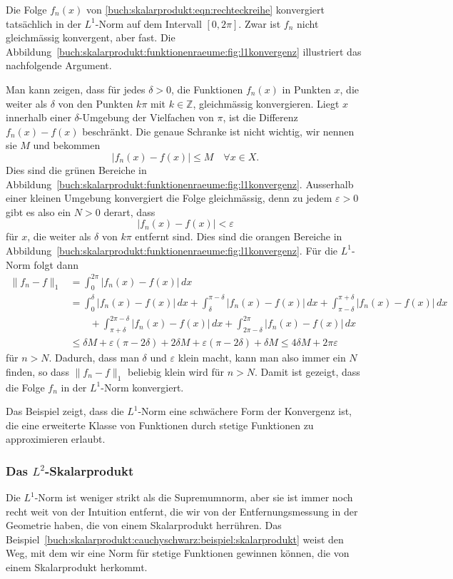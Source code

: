 \begin{beispiel}
Die Folge $f_n(x)$ von \eqref{buch:skalarprodukt:eqn:rechteckreihe}
konvergiert tatsächlich in der $L^1$-Norm auf dem Intervall $[0,2\pi]$.
Zwar ist $f_n$ nicht gleichmässig konvergent, aber fast.
Die Abbildung~\ref{buch:skalarprodukt:funktionenraeume:fig:l1konvergenz}
illustriert das nachfolgende Argument.

Man kann zeigen, dass für jedes $\delta>0$, die Funktionen
$f_n(x)$ in Punkten $x$, die weiter als $\delta$ von den
Punkten $k\pi$ mit $k\in\mathbb{Z}$, gleichmässig konvergieren.
Liegt $x$ innerhalb einer $\delta$-Umgebung der Vielfachen von $\pi$,
ist die Differenz $f_n(x)-f(x)$ beschränkt.
Die genaue Schranke ist nicht wichtig, wir nennen sie $M$ und bekommen
\[
|f_n(x)-f(x)|
\le M
\quad\forall x\in X.
\]
Dies sind die grünen Bereiche in
Abbildung~\ref{buch:skalarprodukt:funktionenraeume:fig:l1konvergenz}.
Ausserhalb einer kleinen Umgebung konvergiert die Folge gleichmässig,
denn zu jedem $\varepsilon>0$ gibt es also ein $N>0$ derart, dass
\[
|f_n(x)-f(x)|<\varepsilon
\]
für $x$, die weiter als $\delta$ von $k\pi$ entfernt sind.
Dies sind die orangen Bereiche in
Abbildung~\ref{buch:skalarprodukt:funktionenraeume:fig:l1konvergenz}.
Für die $L^1$-Norm folgt dann
\begin{align*}
\|f_n-f\|_1
&=
\int_0^{2\pi} |f_n(x)-f(x)|\,dx
\\
&=
\int_0^\delta |f_n(x)-f(x)|\,dx
+
\int_\delta^{\pi-\delta} |f_n(x)-f(x)|\,dx
+
\int_{\pi-\delta}^{\pi+\delta} |f_n(x)-f(x)|\,dx
\\
&\qquad
+
\int_{\pi+\delta}^{2\pi-\delta} |f_n(x)-f(x)|\,dx
+
\int_{2\pi-\delta}^{2\pi} |f_n(x)-f(x)|\,dx
\\
&\le
\delta M
+
\varepsilon (\pi -2\delta)
+
2\delta M
+
\varepsilon (\pi -2\delta)
+
\delta M
\le
4\delta M + 2\pi\varepsilon
\end{align*}
für $n>N$.
Dadurch, dass man $\delta$ und $\varepsilon$ klein macht, kann man
also immer ein $N$ finden, so dass $\|f_n-f\|_1$ beliebig klein wird
für $n>N$.
Damit ist gezeigt, dass die Folge $f_n$ in der $L^1$-Norm konvergiert.
\end{beispiel}

Das Beispiel zeigt, dass die $L^1$-Norm eine schwächere Form der Konvergenz
ist, die eine erweiterte Klasse von Funktionen durch stetige Funktionen
zu approximieren erlaubt.

%
%
\subsubsection{Das $L^2$-Skalarprodukt}
Die $L^1$-Norm ist weniger strikt als die Supremumnorm, aber sie ist
immer noch recht weit von der Intuition entfernt, die wir von der
Entfernungsmessung in der Geometrie haben, die von einem Skalarprodukt
herrühren.
Das Beispiel~\ref{buch:skalarprodukt:cauchyschwarz:beispiel:skalarprodukt}
weist den Weg, mit dem wir eine Norm für stetige Funktionen gewinnen
können, die von einem Skalarprodukt herkommt.

